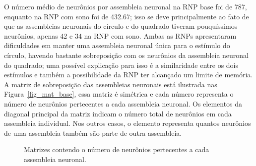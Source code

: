 O número médio de neurônios por assembleia neuronal na RNP base foi de 787, enquanto na RNP com sono foi de 432.67; isso se deve
principalmente ao fato de que as assembleias neuronais do círculo e do quadrado tiveram pouquíssimos neurônios, apenas 42 e 34 na
RNP com sono. Ambas as RNPs apresentaram dificuldades em manter uma assembleia neuronal única para o estímulo do círculo, havendo
bastante sobreposição com os neurônios da assembleia neuronal do quadrado; uma possível explicação para isso é a similaridade
entre os dois estímulos e também a possibilidade da RNP ter alcançado um limite de memória. A matriz de sobreposição das
assembleias neuronais está ilustrada nas Figura~\ref{fig_mat_base}, essa matriz é simétrica e cada número representa o número de
neurônios pertecentes a cada assembleia neuronal. Os elementos da diagonal principal da matriz indicam o número total de neurônios
em cada assembleia individual. Nos outros casos, o elemento representa quantos neurônios de uma assembleia também são parte de
outra assembleia.

\begin{figure}[!ht]
\caption{Matrizes contendo o número de neurônios pertecentes a cada assembleia neuronal.}
\end{figure}

